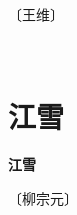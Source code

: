 \documentclass[12pt,UTF-8,openany,fontset=none]{ctexbook}
\begin{document}
\begin{center}
    \vspace{10pt}
    
    \begin{large}
        
        〔王维〕
        
    \end{large}
    
    \vspace{8pt}
    
    \begin{huge}
        
        \phantom{。}~~

        \phantom{。}
        
        \phantom{。}

        \phantom{。}
        
    \end{huge}
    
\end{center}

\vspace{8pt}
\clearpage


\section{江雪}



\begin{center}
    {\bfseries 江雪}
\end{center}

\begin{center}
    \vspace{10pt}
    
    \begin{large}
        
        〔柳宗元〕
        
    \end{large}
    
    \vspace{8pt}
    
    \begin{huge}
        
        \phantom{。}

        \phantom{。}
        
        \phantom{。}

        \phantom{。}
        
    \end{huge}
    
\end{center}
\end{document}

